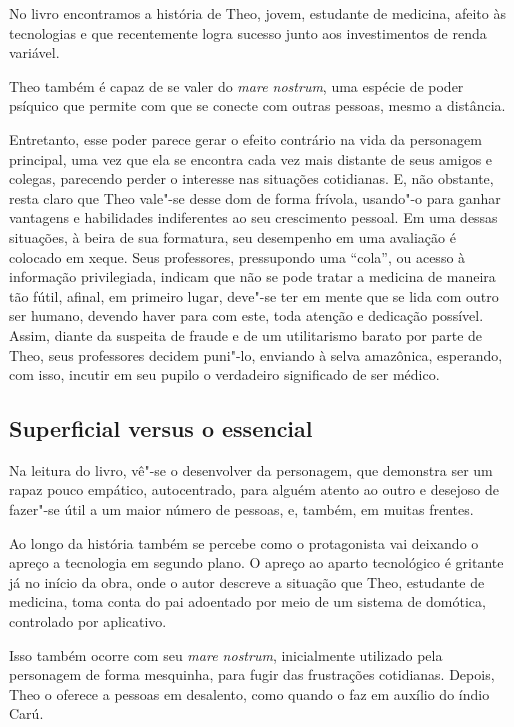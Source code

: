 No livro encontramos a história de Theo, jovem, estudante de medicina,
afeito às tecnologias e que recentemente logra sucesso junto aos
investimentos de renda variável.

Theo também é capaz de se valer do \emph{mare nostrum}, uma espécie de
poder psíquico que permite com que se conecte com outras pessoas, mesmo
a distância.

Entretanto, esse poder parece gerar o efeito contrário na vida da
personagem principal, uma vez que ela se encontra cada vez mais distante
de seus amigos e colegas, parecendo perder o interesse nas situações
cotidianas. E, não obstante, resta claro que Theo vale"-se desse dom de
forma frívola, usando"-o para ganhar vantagens e habilidades indiferentes
ao seu crescimento pessoal. Em uma dessas situações, à beira de sua
formatura, seu desempenho em uma avaliação é colocado em xeque. Seus
professores, pressupondo uma ``cola'', ou acesso à informação
privilegiada, indicam que não se pode tratar a medicina de maneira tão
fútil, afinal, em primeiro lugar, deve"-se ter em mente que se lida com
outro ser humano, devendo haver para com este, toda atenção e dedicação
possível. Assim, diante da suspeita de fraude e de um utilitarismo
barato por parte de Theo, seus professores decidem puni"-lo, enviando à
selva amazônica, esperando, com isso, incutir em seu pupilo o verdadeiro
significado de ser médico.

\subsection{Superficial versus o essencial}

Na leitura do livro, vê"-se o desenvolver da personagem, que demonstra
ser um rapaz pouco empático, autocentrado, para alguém atento ao outro e
desejoso de fazer"-se útil a um maior número de pessoas, e, também, em
muitas frentes.

Ao longo da história também se percebe como o protagonista vai deixando
o apreço a tecnologia em segundo plano. O apreço ao aparto tecnológico é
gritante já no início da obra, onde o autor descreve a situação que
Theo, estudante de medicina, toma conta do pai adoentado por meio de um
sistema de domótica, controlado por aplicativo.

Isso também ocorre com seu \emph{mare nostrum}, inicialmente utilizado
pela personagem de forma mesquinha, para fugir das frustrações
cotidianas. Depois, Theo o oferece a pessoas em desalento, como quando o
faz em auxílio do índio Carú.

